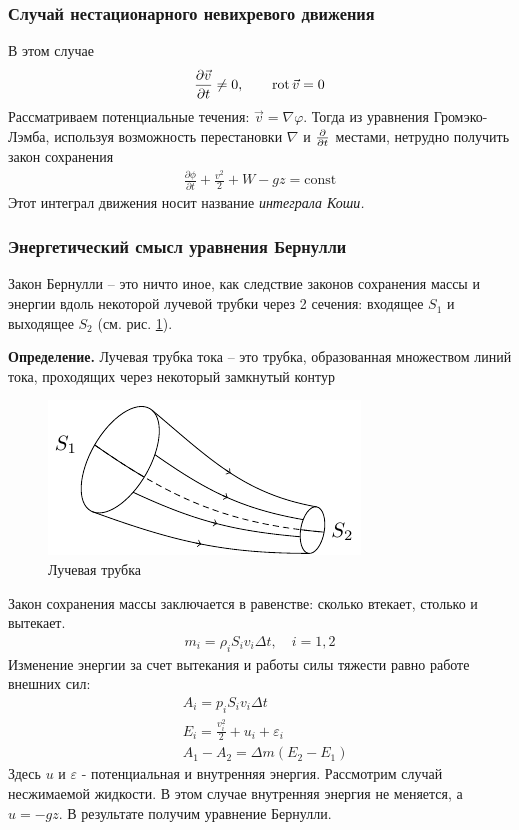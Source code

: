 \subsubsection{Случай нестационарного невихревого движения}
В этом случае
\begin{align*}
	\frac { \partial \vec{v} } { \partial t } \neq 0, \qquad
	\operatorname{rot} \vec{v} = 0
\end{align*}
Рассматриваем  потенциальные течения: $ \vec{v} = \nabla \varphi $. Тогда из уравнения Громэко-Лэмба, используя возможность перестановки $\nabla$ и $\pdv{t}$ местами, нетрудно получить закон сохранения
\begin{align*}
\frac { \partial \phi } { \partial t } + \frac { v ^ { 2 } } { 2 } + W - g z = \mathrm { const }
\end{align*}
Этот интеграл движения носит название \textit{интеграла Коши.}

\subsubsection{Энергетический смысл уравнения Бернулли}

Закон Бернулли --  это ничто иное, как следствие законов сохранения массы и энергии вдоль некоторой лучевой трубки через 2 сечения: входящее $S_1$ и выходящее $S_2$ (см. рис. \ref{fig:figure7}).

\textbf{Определение. } Лучевая трубка тока -- это трубка, образованная множеством линий тока, проходящих через некоторый замкнутый контур
\begin{figure}[H]
	\centering
	\includegraphics[scale=1.5]{img/trubka}
	\caption{Лучевая трубка}
	\label{fig:figure7}
\end{figure}

Закон сохранения массы заключается в равенстве: сколько втекает, столько и вытекает.
\begin{align*}
m _ { i } = \rho _ { i } S _ { i } v _ { i } \Delta t , \quad i = 1,2
\end{align*}
Изменение энергии за счет вытекания и работы силы тяжести равно работе внешних сил:
\begin{align*}
& A _ { i } = p _ { i } S _ { i } v _ { i } \Delta t \\
& E _ { i } = \frac { v _ { i } ^ { 2 } } { 2 } + u _ { i } + \varepsilon _ { i } \\
& A _ { 1 } - A _ { 2 } = \Delta m \left( E _ { 2 } - E _ { 1 } \right)
\end{align*}
Здесь $u$ и $\varepsilon$ - потенциальная и внутренняя энергия. Рассмотрим случай несжимаемой жидкости. В этом случае внутренняя энергия не меняется, а $ u = - g z $. В результате получим уравнение Бернулли.



